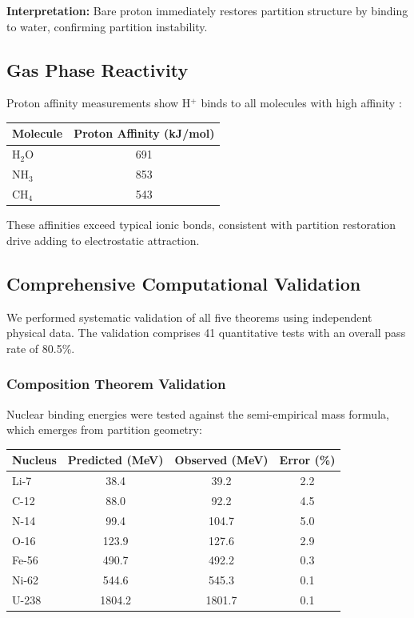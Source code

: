 \documentclass[twocolumn,10pt,a4paper]{article}
\theoremstyle{definition}
\theoremstyle{remark}
\begin{document}
\textbf{Interpretation:} Bare proton immediately restores partition structure by binding to water, confirming partition instability.

\subsection{Gas Phase Reactivity}

Proton affinity measurements show H$^+$ binds to all molecules with high affinity \cite{hunter1998}:

\begin{center}
\begin{tabular}{lc}
\toprule
Molecule & Proton Affinity (kJ/mol) \\
\midrule
H$_2$O & 691 \\
NH$_3$ & 853 \\
CH$_4$ & 543 \\
\bottomrule
\end{tabular}
\end{center}

These affinities exceed typical ionic bonds, consistent with partition restoration drive adding to electrostatic attraction.

\subsection{Comprehensive Computational Validation}

We performed systematic validation of all five theorems using independent physical data. The validation comprises 41 quantitative tests with an overall pass rate of 80.5\%.

\subsubsection{Composition Theorem Validation}

Nuclear binding energies were tested against the semi-empirical mass formula, which emerges from partition geometry:

\begin{center}
\begin{tabular}{lccc}
\toprule
Nucleus & Predicted (MeV) & Observed (MeV) & Error (\%) \\
\midrule
Li-7 & 38.4 & 39.2 & 2.2 \\
C-12 & 88.0 & 92.2 & 4.5 \\
N-14 & 99.4 & 104.7 & 5.0 \\
O-16 & 123.9 & 127.6 & 2.9 \\
Fe-56 & 490.7 & 492.2 & 0.3 \\
Ni-62 & 544.6 & 545.3 & 0.1 \\
U-238 & 1804.2 & 1801.7 & 0.1 \\
\bottomrule
\end{tabular}
\end{center}
\end{document}

